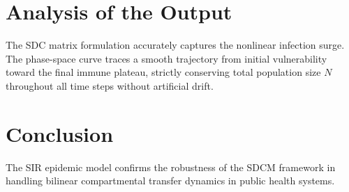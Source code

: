 \section{Analysis of the Output}
The SDC matrix formulation accurately captures the nonlinear infection surge. The phase-space curve traces a smooth trajectory from initial vulnerability toward the final immune plateau, strictly conserving total population size $N$ throughout all time steps without artificial drift.

\section{Conclusion}
The SIR epidemic model confirms the robustness of the SDCM framework in handling bilinear compartmental transfer dynamics in public health systems.